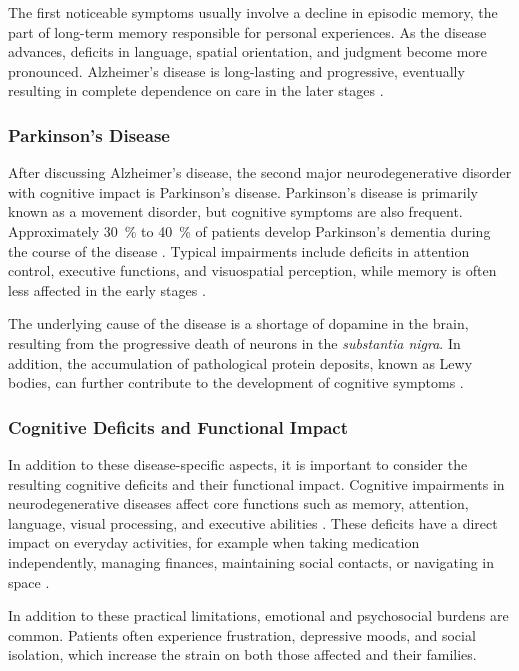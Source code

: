 The first noticeable symptoms usually involve a decline in episodic memory, the part of long-term memory responsible for personal experiences. As the disease advances, deficits in language, spatial orientation, and judgment become more pronounced. Alzheimer’s disease is long-lasting and progressive, eventually resulting in complete dependence on care in the later stages \cite{WorldHealthOrganization.2021}.

\subsubsection{Parkinson's Disease}
After discussing Alzheimer’s disease, the second major neurodegenerative disorder with cognitive impact is Parkinson’s disease. Parkinson’s disease is primarily known as a movement disorder, but cognitive symptoms are also frequent. Approximately \SI{30}{\%} to \SI{40}{\%} of patients develop Parkinson’s dementia during the course of the disease \cite{Janvin.2005}. Typical impairments include deficits in attention control, executive functions, and visuospatial perception, while memory is often less affected in the early stages \cite{Emre.2007}.

The underlying cause of the disease is a shortage of dopamine in the brain, resulting from the progressive death of neurons in the \textit{substantia nigra}. In addition, the accumulation of pathological protein deposits, known as Lewy bodies, can further contribute to the development of cognitive symptoms \cite{Kalia.2015}.

\subsubsection{Cognitive Deficits and Functional Impact}
In addition to these disease-specific aspects, it is important to consider the resulting cognitive deficits and their functional impact. Cognitive impairments in neurodegenerative diseases affect core functions such as memory, attention, language, visual processing, and executive abilities \cite{Harvey.2019}. These deficits have a direct impact on everyday activities, for example when taking medication independently, managing finances, maintaining social contacts, or navigating in space \cite{AmericanPsychiatricAssociation.2013}.

In addition to these practical limitations, emotional and psychosocial burdens are common. Patients often experience frustration, depressive moods, and social isolation, which increase the strain on both those affected and their families.

